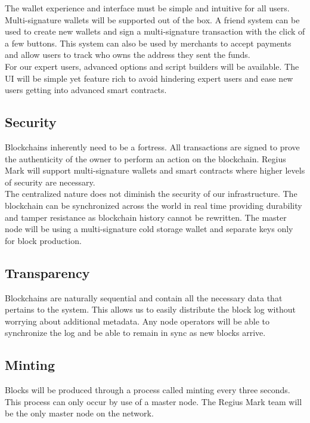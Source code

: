 \documentclass[12pt,a4paper]{article}
\begin{document}
  The wallet experience and interface must be simple and intuitive for all
  users. Multi-signature wallets will be supported out of the box. A friend
  system can be used to create new wallets and sign a multi-signature
  transaction with the click of a few buttons. This system can also be used by
  merchants to accept payments and allow users to track who owns the address
  they sent the funds.\\

  For our expert users, advanced options and script builders will be available.
  The UI will be simple yet feature rich to avoid hindering expert users and
  ease new users getting into advanced smart contracts.

  \subsection{Security}
  Blockchains inherently need to be a fortress. All transactions are signed to
  prove the authenticity of the owner to perform an action on the blockchain.
  Regius Mark will support multi-signature wallets and smart contracts where
  higher levels of security are necessary.\\

  \newpage
  The centralized nature does not diminish the security of our infrastructure.
  The blockchain can be synchronized across the world in real time providing
  durability and tamper resistance as blockchain history cannot be rewritten.
  The master node will be using a multi-signature cold storage wallet and
  separate keys only for block production.

  \subsection{Transparency}
  Blockchains are naturally sequential and contain all the necessary data that
  pertains to the system. This allows us to easily distribute the block log
  without worrying about additional metadata. Any node operators will be able to
  synchronize the log and be able to remain in sync as new blocks arrive.

  \subsection{Minting}
  Blocks will be produced through a process called minting every three seconds.
  This process can only occur by use of a master node. The Regius Mark team will
  be the only master node on the network.\\
\end{document}
